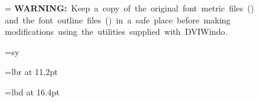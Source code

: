 \def\TIFF{{\sc tiff}}

\newbox\boxa

\setbox\boxa=\vbox{
\hbox{{\bf WARNING:} Keep a copy of the original font metric files ({\PFM})}
\hbox{and the font outline files ({\PFB}) in a safe place before making}
\hbox{modifications using the utilities supplied with {DVI\-Windo}.}
}

\def\warning{\centerline{\boxit{\copy\boxa}}}


\font\sy=sy

\def\registered{{\sy \char210}}

\def\TM{$^{\smlsize TM}$}

\font\twelverm=lbr at 11.2pt

\font\eighteenbf=lbd at 16.4pt

\def\coverpage{
\noheaders
\topglue 1.5in
\centerline{\bigggsize\bf Outline Font and Font Metrics}
\vskip .1in
\centerline{\bigggsize\bf Manipulation Package --- Release 1.4}

\vskip 3in





\centerline{\hbox to 1.33in{\special{illustration c:/ps/y&ylogo}\hfill}}



\vskip 1in

\centerline{\bigsize {\Y&Y}, Inc. 45 Walden Street, Concord MA 01742, USA}

\vskip .02in

\centerline{\bigsize 
http://www.YandY.com}

\newpage
\decreasepageno

\noheaders
\topglue 2in
\hbox{ }	%
\newpage
\decreasepageno
}

